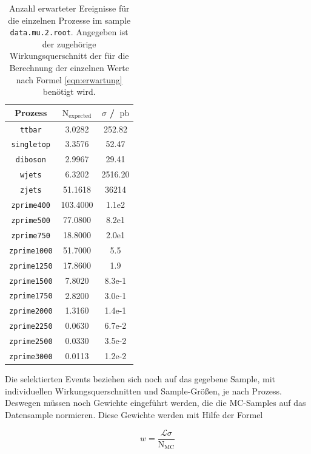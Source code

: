 \begin{table}[H]
    \centering
    \caption{Anzahl erwarteter Ereignisse für die einzelnen Prozesse im sample \texttt{data.mu.2.root}. Angegeben 
    ist der zugehörige Wirkungsquerschnitt der für die Berechnung der einzelnen Werte nach Formel 
    \eqref{eqn:erwartung} benötigt wird.}
    \label{tab:Erwartungen}
    \begin{tabular}{c|cc}
    \toprule 
    Prozess & $\text{N}_\text{expected}$ & $\sigma$ / $\SI{}{\pico\barn}$ \\
    \midrule
    \texttt{ttbar}      &  3.0282   & 252.82    \\
    \texttt{singletop}  &  3.3576   & 52.47     \\
    \texttt{diboson}    &  2.9967   & 29.41     \\
    \texttt{wjets}      &  6.3202   & 2516.20   \\
    \texttt{zjets}      &  51.1618  & 36214     \\
    \texttt{zprime400}  &  103.4000 & 1.1e2     \\
    \texttt{zprime500}  &  77.0800  & 8.2e1     \\
    \texttt{zprime750}  &  18.8000  & 2.0e1     \\
    \texttt{zprime1000} &  51.7000  & 5.5       \\
    \texttt{zprime1250} &  17.8600  & 1.9       \\
    \texttt{zprime1500} &  7.8020   & 8.3e-1    \\
    \texttt{zprime1750} &  2.8200   & 3.0e-1    \\
    \texttt{zprime2000} &  1.3160   & 1.4e-1    \\
    \texttt{zprime2250} &  0.0630   & 6.7e-2    \\
    \texttt{zprime2500} &  0.0330   & 3.5e-2    \\
    \texttt{zprime3000} &  0.0113   & 1.2e-2    \\
    \bottomrule 
    \end{tabular}
\end{table}

Die selektierten Events beziehen sich noch auf das gegebene Sample, mit individuellen 
Wirkungsquerschnitten und Sample-Größen, je nach Prozess. Deswegen müssen noch 
Gewichte eingeführt werden, die die MC-Samples auf das Datensample normieren. Diese 
Gewichte werden mit Hilfe der Formel 

\begin{equation}
w = \frac{\mathcal{L} \sigma}{\text{N}_\text{MC}}
\label{eqn:gewichte}
\end{equation}

